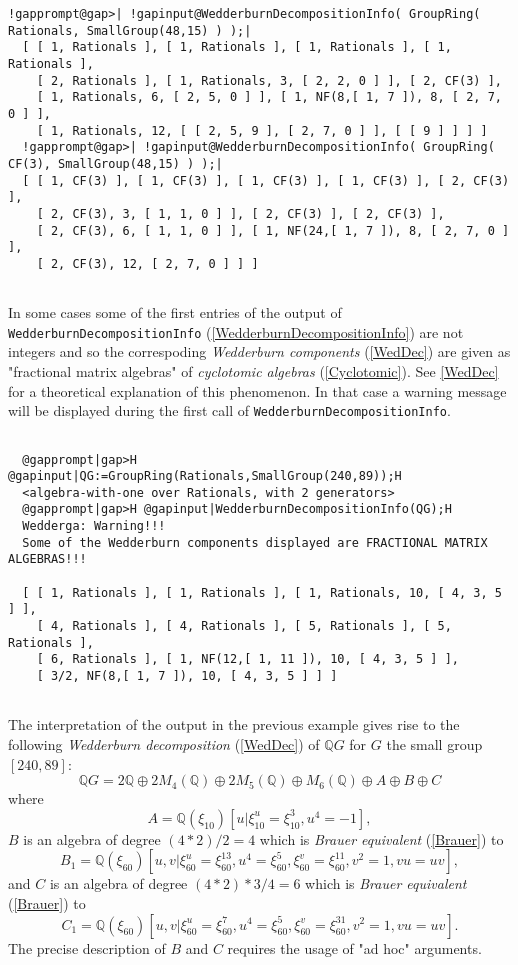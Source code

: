 \documentclass[a4paper,11pt]{report}
\begin{document}
{{\begin{Verbatim}[commandchars=!@|,fontsize=\small,frame=single,label=Example]
  !gapprompt@gap>| !gapinput@WedderburnDecompositionInfo( GroupRing( Rationals, SmallGroup(48,15) ) );|
  [ [ 1, Rationals ], [ 1, Rationals ], [ 1, Rationals ], [ 1, Rationals ],
    [ 2, Rationals ], [ 1, Rationals, 3, [ 2, 2, 0 ] ], [ 2, CF(3) ],
    [ 1, Rationals, 6, [ 2, 5, 0 ] ], [ 1, NF(8,[ 1, 7 ]), 8, [ 2, 7, 0 ] ],
    [ 1, Rationals, 12, [ [ 2, 5, 9 ], [ 2, 7, 0 ] ], [ [ 9 ] ] ] ]
  !gapprompt@gap>| !gapinput@WedderburnDecompositionInfo( GroupRing( CF(3), SmallGroup(48,15) ) );|
  [ [ 1, CF(3) ], [ 1, CF(3) ], [ 1, CF(3) ], [ 1, CF(3) ], [ 2, CF(3) ],
    [ 2, CF(3), 3, [ 1, 1, 0 ] ], [ 2, CF(3) ], [ 2, CF(3) ],
    [ 2, CF(3), 6, [ 1, 1, 0 ] ], [ 1, NF(24,[ 1, 7 ]), 8, [ 2, 7, 0 ] ],
    [ 2, CF(3), 12, [ 2, 7, 0 ] ] ]
  
\end{Verbatim}
 In some cases some of the first entries of the output of \texttt{WedderburnDecompositionInfo} (\ref{WedderburnDecompositionInfo}) are not integers and so the correspoding \emph{Wedderburn components} (\ref{WedDec}) are given as "fractional matrix algebras" of \emph{cyclotomic algebras} (\ref{Cyclotomic}). See \ref{WedDec} for a theoretical explanation of this phenomenon. In that case a warning
message will be displayed during the first call of \texttt{WedderburnDecompositionInfo}. 
\begin{Verbatim}[commandchars=@|H,fontsize=\small,frame=single,label=Example]
  
  @gapprompt|gap>H @gapinput|QG:=GroupRing(Rationals,SmallGroup(240,89));H
  <algebra-with-one over Rationals, with 2 generators>
  @gapprompt|gap>H @gapinput|WedderburnDecompositionInfo(QG);H
  Wedderga: Warning!!! 
  Some of the Wedderburn components displayed are FRACTIONAL MATRIX ALGEBRAS!!!
  
  [ [ 1, Rationals ], [ 1, Rationals ], [ 1, Rationals, 10, [ 4, 3, 5 ] ],
    [ 4, Rationals ], [ 4, Rationals ], [ 5, Rationals ], [ 5, Rationals ],
    [ 6, Rationals ], [ 1, NF(12,[ 1, 11 ]), 10, [ 4, 3, 5 ] ],
    [ 3/2, NF(8,[ 1, 7 ]), 10, [ 4, 3, 5 ] ] ]
  
\end{Verbatim}
 The interpretation of the output in the previous example gives rise to the
following \emph{Wedderburn decomposition} (\ref{WedDec}) of ${\ensuremath{\mathbb Q}} G$ for $G$ the small group $[240,89]$: 
\[ {\ensuremath{\mathbb Q}} G = 2 {\ensuremath{\mathbb Q}} \oplus 2 M_4(
{\ensuremath{\mathbb Q}} ) \oplus 2 M_5( {\ensuremath{\mathbb Q}} ) \oplus
M_6( {\ensuremath{\mathbb Q}} ) \oplus A \oplus B \oplus C \]
 where 
\[ A = {\ensuremath{\mathbb Q}} (\xi_{10})[u|\xi_{10}^u = \xi_{10}^3, u^4 = -1], \]
 $B$ is an algebra of degree $(4*2 )/2 = 4 $ which is \emph{Brauer equivalent} (\ref{Brauer}) to 
\[ B_1 = {\ensuremath{\mathbb Q}} (\xi_{60})[u,v|\xi_{60}^u = \xi_{60}^{13}, u^4
= \xi_{60}^5, \xi_{60}^v = \xi_{60}^{11}, v^2 = 1, vu=uv], \]
 and $C$ is an algebra of degree $(4*2)*3/4 = 6 $ which is \emph{Brauer equivalent} (\ref{Brauer}) to 
\[ C_1 = {\ensuremath{\mathbb Q}} (\xi_{60})[u,v|\xi_{60}^u = \xi_{60}^7, u^4 =
\xi_{60}^5, \xi_{60}^v = \xi_{60}^{31}, v^2 = 1, vu=uv]. \]
 The precise description of $B$ and $C$ requires the usage of "ad hoc" arguments. }

}
\end{document}
